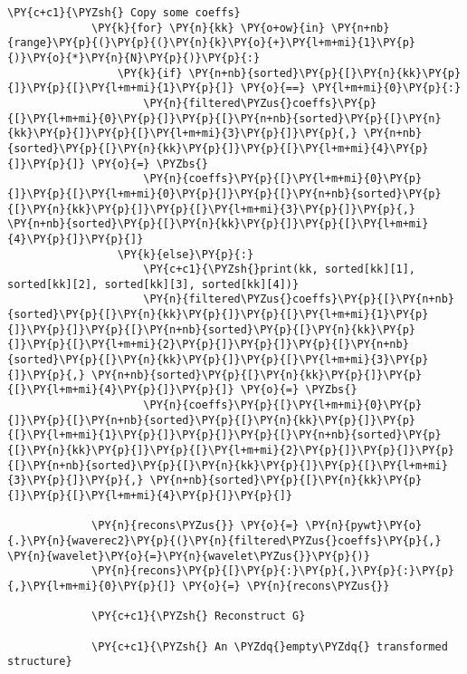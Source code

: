 \begin{Verbatim}[commandchars=\\\{\}]
             \PY{c+c1}{\PYZsh{} Copy some coeffs}
             \PY{k}{for} \PY{n}{kk} \PY{o+ow}{in} \PY{n+nb}{range}\PY{p}{(}\PY{p}{(}\PY{n}{k}\PY{o}{+}\PY{l+m+mi}{1}\PY{p}{)}\PY{o}{*}\PY{n}{N}\PY{p}{)}\PY{p}{:}
                 \PY{k}{if} \PY{n+nb}{sorted}\PY{p}{[}\PY{n}{kk}\PY{p}{]}\PY{p}{[}\PY{l+m+mi}{1}\PY{p}{]} \PY{o}{==} \PY{l+m+mi}{0}\PY{p}{:}
                     \PY{n}{filtered\PYZus{}coeffs}\PY{p}{[}\PY{l+m+mi}{0}\PY{p}{]}\PY{p}{[}\PY{n+nb}{sorted}\PY{p}{[}\PY{n}{kk}\PY{p}{]}\PY{p}{[}\PY{l+m+mi}{3}\PY{p}{]}\PY{p}{,} \PY{n+nb}{sorted}\PY{p}{[}\PY{n}{kk}\PY{p}{]}\PY{p}{[}\PY{l+m+mi}{4}\PY{p}{]}\PY{p}{]} \PY{o}{=} \PYZbs{}
                     \PY{n}{coeffs}\PY{p}{[}\PY{l+m+mi}{0}\PY{p}{]}\PY{p}{[}\PY{l+m+mi}{0}\PY{p}{]}\PY{p}{[}\PY{n+nb}{sorted}\PY{p}{[}\PY{n}{kk}\PY{p}{]}\PY{p}{[}\PY{l+m+mi}{3}\PY{p}{]}\PY{p}{,} \PY{n+nb}{sorted}\PY{p}{[}\PY{n}{kk}\PY{p}{]}\PY{p}{[}\PY{l+m+mi}{4}\PY{p}{]}\PY{p}{]}
                 \PY{k}{else}\PY{p}{:}
                     \PY{c+c1}{\PYZsh{}print(kk, sorted[kk][1], sorted[kk][2], sorted[kk][3], sorted[kk][4])}
                     \PY{n}{filtered\PYZus{}coeffs}\PY{p}{[}\PY{n+nb}{sorted}\PY{p}{[}\PY{n}{kk}\PY{p}{]}\PY{p}{[}\PY{l+m+mi}{1}\PY{p}{]}\PY{p}{]}\PY{p}{[}\PY{n+nb}{sorted}\PY{p}{[}\PY{n}{kk}\PY{p}{]}\PY{p}{[}\PY{l+m+mi}{2}\PY{p}{]}\PY{p}{]}\PY{p}{[}\PY{n+nb}{sorted}\PY{p}{[}\PY{n}{kk}\PY{p}{]}\PY{p}{[}\PY{l+m+mi}{3}\PY{p}{]}\PY{p}{,} \PY{n+nb}{sorted}\PY{p}{[}\PY{n}{kk}\PY{p}{]}\PY{p}{[}\PY{l+m+mi}{4}\PY{p}{]}\PY{p}{]} \PY{o}{=} \PYZbs{}
                     \PY{n}{coeffs}\PY{p}{[}\PY{l+m+mi}{0}\PY{p}{]}\PY{p}{[}\PY{n+nb}{sorted}\PY{p}{[}\PY{n}{kk}\PY{p}{]}\PY{p}{[}\PY{l+m+mi}{1}\PY{p}{]}\PY{p}{]}\PY{p}{[}\PY{n+nb}{sorted}\PY{p}{[}\PY{n}{kk}\PY{p}{]}\PY{p}{[}\PY{l+m+mi}{2}\PY{p}{]}\PY{p}{]}\PY{p}{[}\PY{n+nb}{sorted}\PY{p}{[}\PY{n}{kk}\PY{p}{]}\PY{p}{[}\PY{l+m+mi}{3}\PY{p}{]}\PY{p}{,} \PY{n+nb}{sorted}\PY{p}{[}\PY{n}{kk}\PY{p}{]}\PY{p}{[}\PY{l+m+mi}{4}\PY{p}{]}\PY{p}{]}
                 
             \PY{n}{recons\PYZus{}} \PY{o}{=} \PY{n}{pywt}\PY{o}{.}\PY{n}{waverec2}\PY{p}{(}\PY{n}{filtered\PYZus{}coeffs}\PY{p}{,} \PY{n}{wavelet}\PY{o}{=}\PY{n}{wavelet\PYZus{}}\PY{p}{)}
             \PY{n}{recons}\PY{p}{[}\PY{p}{:}\PY{p}{,}\PY{p}{:}\PY{p}{,}\PY{l+m+mi}{0}\PY{p}{]} \PY{o}{=} \PY{n}{recons\PYZus{}}
         
             \PY{c+c1}{\PYZsh{} Reconstruct G}
         
             \PY{c+c1}{\PYZsh{} An \PYZdq{}empty\PYZdq{} transformed structure}
         

\end{Verbatim}
